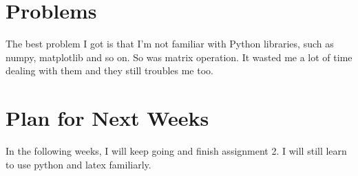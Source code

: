 \documentclass{article} %
\begin{document}
\section{Problems}
The best problem I got is that I'm not familiar with Python libraries, such as numpy, matplotlib and so on. So was matrix operation. It wasted me a lot of time dealing with them and they still troubles me too.

\section{Plan for Next Weeks}
In the following weeks, I will keep going and finish assignment 2. I will still learn to use python and latex familiarly.
\end{document}
